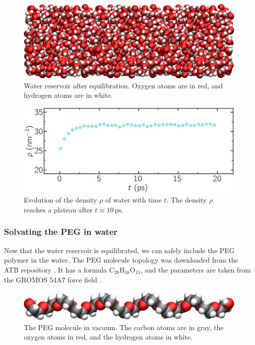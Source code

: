 \documentclass[9pt,tutorial]{livecoms}
\begin{document}
\begin{figure}
\centering
\includegraphics[width=\linewidth]{PEG-water}
\caption{Water reservoir after equilibration. Oxygen atoms are in red, and hydrogen atoms are in white.}
\label{fig:PEG-water}
\end{figure}

\begin{figure}
\centering
\includegraphics[width=\linewidth]{PEG-density}
\caption{Evolution of the density $\rho$ of water with time $t$. The density $\rho$ reaches a plateau after $t \approx 10\,\text{ps}$.}
\label{fig:PEG-density}
\end{figure}

\subsubsection{Solvating the PEG in water}
Now that the water reservoir is equilibrated, we can safely include the PEG polymer in the water. The PEG molecule topology was downloaded from the ATB repository \cite{malde2011automated, oostenbrink2004biomolecular}. It has a formula $\text{C}_{28}\text{H}_{58}\text{O}_{15}$, and the parameters are taken from
the GROMOS 54A7 force field \cite{schmid2011definition}.

\begin{figure}
\centering
\includegraphics[width=\linewidth]{PEG-in-vacuum}
\caption{The PEG molecule in vacuum. The carbon atoms are in gray, the oxygen atoms in red, and the hydrogen atoms in white.}
\label{fig:PEG-in-vacuum}
\end{figure}
\end{document}
